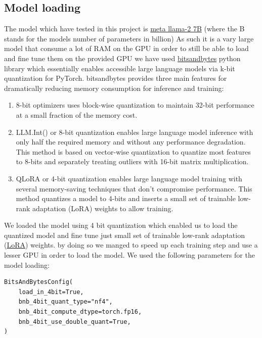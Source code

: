 \documentclass[11pt]{article}
\begin{document}
\subsection{Model loading}
The model which have tested in this project is  \href{https://huggingface.co/NousResearch/Llama-2-7b-chat-hf }{meta llama-2 7B} (where the B stands for the models number of parameters in billion) As such it is a vary large model that consume a lot of RAM on the GPU in order to still be able to load and fine tune them on the provided GPU we have used \href{https://pypi.org/project/bitsandbytes/}{bitsandbytes} python library which essentially enables accessible large language models via k-bit quantization for PyTorch. bitsandbytes provides three main features for dramatically reducing memory consumption for inference and training:
\begin{enumerate}
    \item 8-bit optimizers uses block-wise quantization to maintain 32-bit performance at a small fraction of the memory cost.
    \item LLM.Int() or 8-bit quantization enables large language model inference with only half the required memory and without any performance degradation. This method is based on vector-wise quantization to quantize most features to 8-bits and separately treating outliers with 16-bit matrix multiplication.
    \item QLoRA or 4-bit quantization enables large language model training with several memory-saving techniques that don’t compromise performance. This method quantizes a model to 4-bits and inserts a small set of trainable low-rank adaptation (LoRA) weights to allow training.
\end{enumerate}



We loaded the model using 4 bit quantization which enabled us to load the quantized model and fine tune just small set of trainable low-rank adaptation (\href{https://huggingface.co/docs/peft/main/en/conceptual_guides/lora}{LoRA}) weights. by doing so we manged to speed up each training step and use a lesser GPU in order to load the model.
We used the following parameters for the model loading:
\begin{verbatim}
BitsAndBytesConfig(
    load_in_4bit=True,
    bnb_4bit_quant_type="nf4",
    bnb_4bit_compute_dtype=torch.fp16,
    bnb_4bit_use_double_quant=True,
)
\end{verbatim}
\end{document}
